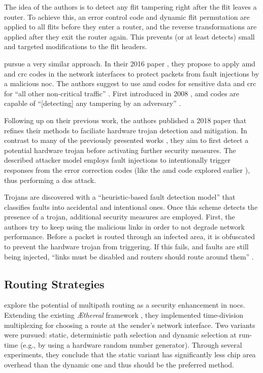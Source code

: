 The idea of the authors is to detect any flit tampering right after the flit leaves a router. To achieve this, an error control code and dynamic flit
permutation are applied to all flits before they enter a router, and the reverse transformations are applied after they exit the router again. This
prevents (or at least detects) small and targeted modifications to the flit headers. %

\citeauthor{boraten16packetsecurity} pursue a very similar approach. In their 2016 paper \cite{boraten16packetsecurity}, they propose to apply
\gls{amd} and \gls{crc} codes in the network interfaces to protect packets from fault injections by a malicious \gls{noc}. The authors suggest to use
\gls{amd} codes for sensitive data and \gls{crc} for \enquote{all other non-critical traffic} \cite[2]{boraten16packetsecurity}. First introduced in 2008
\cite{cramer08amdcodes}, \gls{amd} codes are capable of \enquote{[detecting] any tampering by an adversary} \cite[1]{cramer08amdcodes}.

Following up on their previous work, the authors published a 2018 paper \cite{boraten18mitigationdos} that refines their methods to faciliate hardware
trojan detection and mitigation. In contrast to many of the previously presented works \cites(e.g.)(){ancajas14fortnocs}{frey17hardenednoc}, they aim
to first detect a potential hardware trojan before activating further security measures. The described attacker model employs fault injections to
intentionally trigger responses from the error correction codes (like the \gls{amd} code explored earlier \cite{boraten16packetsecurity}), thus
performing a \gls{dos} attack.

Trojans are discovered with a \enquote{heuristic-based fault detection model} \cite[25]{boraten18mitigationdos} that classifies faults into accidental
and intentional ones. Once this scheme detects the presence of a trojan, additional security measures are employed. First, the authors try to keep
using the malicious links in order to not degrade network performance. Before a packet is routed through an infected area, it is obfuscated to prevent
the hardware trojan from triggering. If this fails, and faults are still being injected, \enquote{links must be disabled and routers should route
around them} \cite[32]{boraten18mitigationdos}.

\subsection{Routing Strategies}
\citeauthor{stefan11enhancingnocs} \cite{stefan11enhancingnocs} explore the potential of multipath routing as a security enhancement in \glspl{noc}.
Extending the existing \textit{\AE thereal} framework \cite{goossens05aethereal}, they implemented time-division multiplexing for choosing a route at
the sender's network interface. Two variants were pursued: static, deterministic path selection and dynamic selection at run-time (e.g., by using a
hardware random number generator). Through several experiments, they conclude that the static variant has significantly less chip area overhead than
the dynamic one and thus should be the preferred method.

